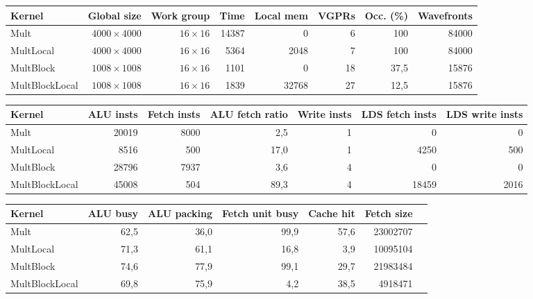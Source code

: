 \begin{table}
	\centering
		\begin{tabular}{l r r r r r r r}
			Kernel & Global size & Work group & Time & Local mem & VGPRs & Occ. (\%) & Wavefronts \\
			\hline
			Mult & $4000 \times 4000$ & $16 \times 16$ & 14387 & 0 & 6 & 100 & 84000 \\
			MultLocal & $4000 \times 4000$ & $16 \times 16$ & 5364 & 2048 & 7 & 100 & 84000 \\
			MultBlock & $1008 \times 1008$ & $16 \times 16$ & 1101 & 0 & 18 & 37,5 & 15876 \\
			MultBlockLocal & $1008 \times 1008$ & $16 \times 16$ & 1839 & 32768 & 27 & 12,5 & 15876 \\
		\end{tabular}
		
		\begin{tabular}{l r r r r r r}
			Kernel & ALU insts & Fetch insts & ALU fetch ratio & Write insts & LDS fetch insts & LDS write insts \\
			\hline
			Mult & 20019 & 8000 & 2,5 & 1 & 0 & 0 \\
			MultLocal & 8516 & 500 & 17,0 & 1 & 4250 & 500 \\
			MultBlock & 28796 & 7937 & 3,6 & 4 & 0 & 0 \\
			MultBlockLocal & 45008 & 504 & 89,3 & 4 & 18459 & 2016 \\
		\end{tabular}
		
		\begin{tabular}{l r r r r r r}
			Kernel & ALU busy & ALU packing & Fetch unit busy & Cache hit & Fetch size \\
			\hline
			Mult & 62,5 & 36,0 & 99,9 & 57,6 & 23002707 \\
			MultLocal & 71,3 & 61,1 & 16,8 & 3,9 & 10095104 \\
			MultBlock & 74,6 & 77,9 & 99,1 & 29,7 & 21983484 \\
			MultBlockLocal & 69,8 & 75,9 & 4,2 & 38,5 & 4918471 \\
		\end{tabular}
		

\end{table}
